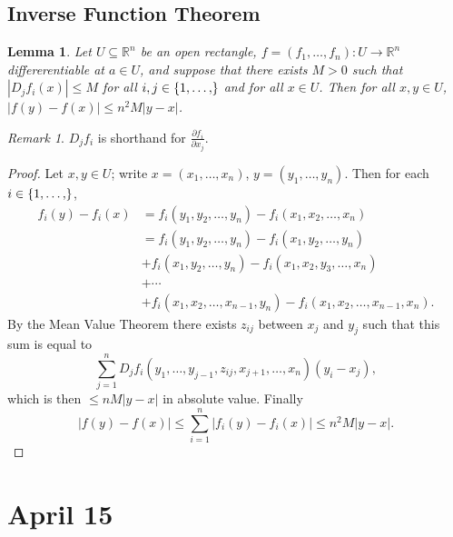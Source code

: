 \documentclass[12pt]{article}
\newcommand{\real}{\mathbb{R}}
\newcommand{\oneton}[1]{\{1,\dotsc,#1\}}
\newtheorem{lemma}[theorem]{Lemma}
\theoremstyle{definition}
\theoremstyle{remark}
\newtheorem*{remark}{Remark}
\begin{document}
\subsection{Inverse Function Theorem}
\begin{lemma}
    Let $U \subseteq \real^n$ be an open rectangle, $f = (f_1 , \dotsc , f_n) : U \to \real^n$ differerentiable at $a \in U$, and suppose that there exists $M > 0$ such that $\left| D_j f_i (x) \right| \leq M$ for all $i, j \in \oneton$ and for all $x \in U$. Then for all $x , y \in U$, $|f(y) - f(x)| \leq n^2 M |y - x|$.
\end{lemma}
\begin{remark}
    $D_j f_i$ is shorthand for $\frac{\partial f_i}{\partial x_j}$.
\end{remark}
\begin{proof}
    Let $x , y \in U$; write $x = (x_1 , \dotsc , x_n)$, $y = (y_1 , \dotsc , y_n)$. Then for each $i \in \oneton$, 
    \begin{equation}
        \begin{split}
            f_i(y) - f_i(x) & = f_i(y_1 , y_2 , \dotsc , y_n) - f_i(x_1 , x_2,  \dotsc , x_n) \\
            & = f_i(y_1 , y_2 , \dotsc , y_n) - f_i(x_1 , y_2 , \dotsc , y_n) \\
            & + f_i(x_1 , y_2 ,  \dotsc , y_n) - f_i(x_1 , x_2, y_3 , \dotsc , x_n) \\
            & + \dotsb \\
            & + f_i(x_1 , x_2 ,\dotsc , x_{n-1} , y_n) - f_i(x_1 , x_2, \dotsc , x_{n-1} , x_n).
        \end{split}
    \end{equation}
    By the Mean Value Theorem there exists $z_{ij}$ between $x_j$ and $y_j$ such that this sum is equal to 
    \begin{equation}
        \sum\limits_{j = 1}^n D_j f_i (y_1 , \dotsc , y_{j-1} , z_{ij} , x_{j+1} , \dotsc , x_n) (y_i - x_j),
    \end{equation}
    which is then $\leq n M |y-x|$ in absolute value. Finally
    \begin{equation}
        |f(y) - f(x)| \leq \sum\limits_{i = 1}^n |f_i(y) - f_i(x)| \leq n^2 M |y-x|.
    \end{equation}
\end{proof}

\section{April 15}
\end{document}
